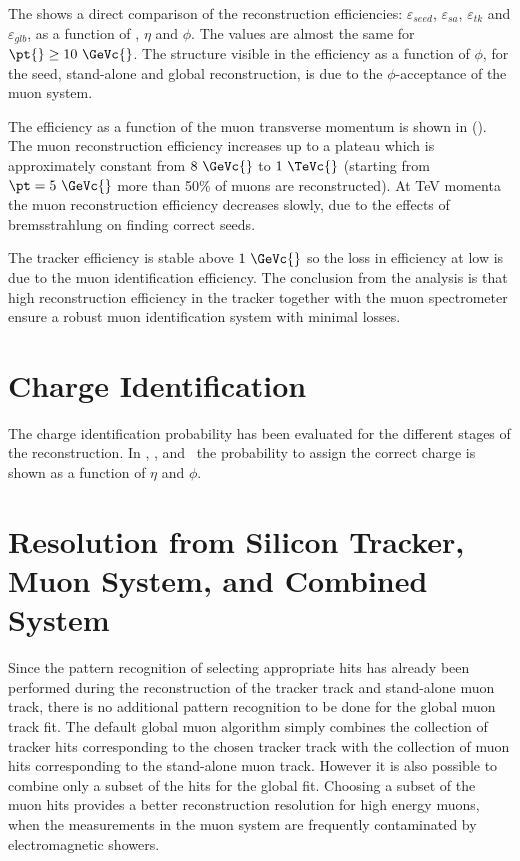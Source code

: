 The  shows a direct comparison of the
 reconstruction efficiencies: $\varepsilon_{seed}$, $\varepsilon_{sa}$,
 $\varepsilon_{tk}$ and $\varepsilon_{glb}$, as a function of \pt{},
 $\eta$ and $\phi$.  The values are almost the same for
 $\pt{} \geq 10~\GeVc{}$. The structure visible in the efficiency as a
 function of $\phi$, for the seed, stand-alone and global
 reconstruction, is due to the $\phi$-acceptance of the muon system.

The efficiency as a function of the muon transverse momentum is shown in
().  The muon reconstruction efficiency increases
up to a plateau which is approximately constant from $8~\GeVc{}$ to
$1~\TeVc{}$ (starting from $\pt=5~\GeVc{}$ more than 50\% of muons are
reconstructed).  At TeV momenta the muon reconstruction efficiency
decreases slowly, due to the effects of bremsstrahlung on finding
correct seeds.

The tracker efficiency is stable above $1~\GeVc{}$ so the loss in
efficiency at low \pt{} is due to the muon identification efficiency.
The conclusion from the analysis is that high reconstruction efficiency
in the tracker together with the muon spectrometer ensure a robust muon
identification system with minimal losses.

\section{Charge Identification}\label{sec:chargeId}
The charge identification probability has been evaluated for the
different stages of the reconstruction. In 
, , and~ the probability to assign the correct charge
is shown as a function of $\eta$ and $\phi$.


\section{\pt Resolution from Silicon Tracker, Muon System, and Combined System}
\label{sec:fullSystem}
Since the pattern recognition of selecting appropriate hits has already
been performed during the reconstruction of the tracker track and stand-alone
muon track, there is no additional pattern recognition to be done for
the global muon track fit.  The default global muon algorithm simply
combines the collection of tracker hits corresponding to the chosen
tracker track with the collection of muon hits corresponding to the
stand-alone muon track. However it is also possible to combine only a
subset of the hits for the global fit. Choosing a subset of the muon
hits provides a better reconstruction resolution for high energy muons,
when the measurements in the muon system are frequently contaminated by
electromagnetic showers.

